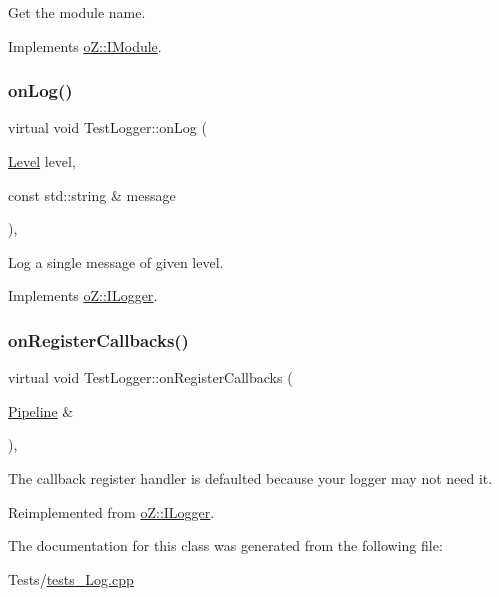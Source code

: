 Get the module name. 



Implements \mbox{\hyperlink{classo_z_1_1_i_module_af41d45158fd28e1bd86a34e25f5282d6}{o\+Z\+::\+I\+Module}}.

\mbox{\label{class_test_logger_ae7b96502995c416dd4d4e7541f1ade80}} 
\subsubsection{\texorpdfstring{onLog()}{onLog()}}
{\footnotesize\ttfamily virtual void Test\+Logger\+::on\+Log (\begin{DoxyParamCaption}\item[{\mbox{\hyperlink{namespaceo_z_a72fc7662d5f07391ac6f0a5699014bfa}{Level}}}]{level,  }\item[{const std\+::string \&}]{message }\end{DoxyParamCaption})\hspace{0.3cm}{\ttfamily [inline]}, {\ttfamily [virtual]}}



Log a single message of given level. 



Implements \mbox{\hyperlink{classo_z_1_1_i_logger_a2e0e168c9218055e41bdd5b57177cba1}{o\+Z\+::\+I\+Logger}}.

\mbox{\label{class_test_logger_a0ee94278a66b189ca55f04e40192b5d1}} 
\subsubsection{\texorpdfstring{onRegisterCallbacks()}{onRegisterCallbacks()}}
{\footnotesize\ttfamily virtual void Test\+Logger\+::on\+Register\+Callbacks (\begin{DoxyParamCaption}\item[{\mbox{\hyperlink{classo_z_1_1_pipeline}{Pipeline}} \&}]{ }\end{DoxyParamCaption})\hspace{0.3cm}{\ttfamily [inline]}, {\ttfamily [virtual]}}



The callback register handler is defaulted because your logger may not need it. 



Reimplemented from \mbox{\hyperlink{classo_z_1_1_i_logger_a10732b6da6e8f085c6fe5fa154d361ef}{o\+Z\+::\+I\+Logger}}.



The documentation for this class was generated from the following file\+:\begin{DoxyCompactItemize}
\item 
Tests/\mbox{\hyperlink{tests___log_8cpp}{tests\+\_\+\+Log.\+cpp}}\end{DoxyCompactItemize}
